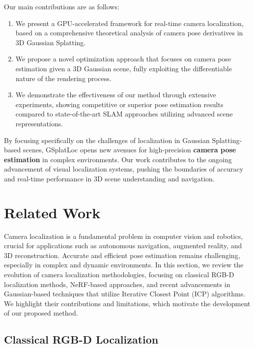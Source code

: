 \documentclass[twocolumn]{article} %
\begin{document}
Our main contributions are as follows:

\begin{enumerate}
\def\labelenumi{\arabic{enumi}.}
\item
  We present a GPU-accelerated framework for real-time camera
  localization, based on a comprehensive theoretical analysis of camera
  pose derivatives in 3D Gaussian Splatting.
\item
  We propose a novel optimization approach that focuses on camera pose
  estimation given a 3D Gaussian scene, fully exploiting the
  differentiable nature of the rendering process.
\item
  We demonstrate the effectiveness of our method through extensive
  experiments, showing competitive or superior pose estimation results
  compared to state-of-the-art SLAM approaches utilizing advanced scene
  representations.
\end{enumerate}

By focusing specifically on the challenges of localization in Gaussian
Splatting-based scenes, GSplatLoc opens new avenues for high-precision
\textbf{camera pose estimation} in complex environments. Our work
contributes to the ongoing advancement of visual localization systems,
pushing the boundaries of accuracy and real-time performance in 3D scene
understanding and navigation.

\section{Related Work}\label{related-work}

Camera localization is a fundamental problem in computer vision and
robotics, crucial for applications such as autonomous navigation,
augmented reality, and 3D reconstruction. Accurate and efficient pose
estimation remains challenging, especially in complex and dynamic
environments. In this section, we review the evolution of camera
localization methodologies, focusing on classical RGB-D localization
methods, NeRF-based approaches, and recent advancements in
Gaussian-based techniques that utilize Iterative Closest Point (ICP)
algorithms. We highlight their contributions and limitations, which
motivate the development of our proposed method.

\subsection{Classical RGB-D
Localization}\label{classical-rgb-d-localization}
\end{document}
